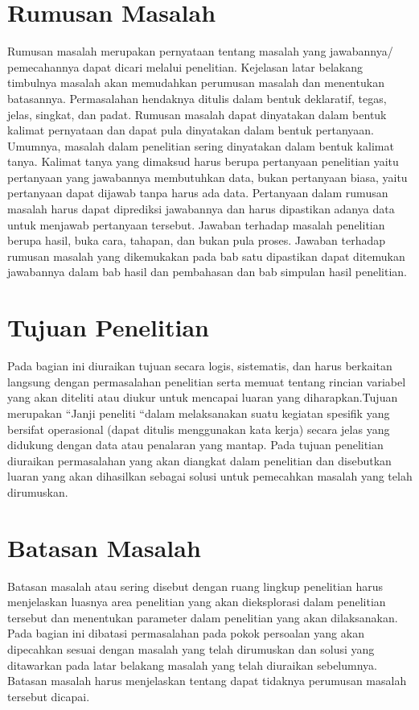 \section{Rumusan Masalah}
Rumusan masalah merupakan pernyataan tentang masalah yang jawabannya/ pemecahannya dapat dicari melalui penelitian. Kejelasan latar belakang timbulnya masalah akan memudahkan perumusan masalah dan menentukan batasannya. Permasalahan hendaknya  ditulis  dalam  bentuk  deklaratif,  tegas, jelas, singkat, dan padat. Rumusan masalah dapat dinyatakan dalam bentuk kalimat pernyataan  dan dapat pula dinyatakan dalam bentuk pertanyaan. Umumnya, masalah dalam penelitian sering dinyatakan dalam bentuk kalimat tanya. Kalimat tanya yang dimaksud harus berupa pertanyaan penelitian yaitu pertanyaan yang jawabannya membutuhkan data, bukan pertanyaan biasa,  yaitu pertanyaan  dapat dijawab tanpa harus ada data.  
Pertanyaan dalam rumusan masalah harus dapat diprediksi jawabannya dan harus dipastikan adanya data untuk menjawab pertanyaan tersebut. Jawaban terhadap masalah penelitian berupa hasil, buka cara, tahapan, dan bukan pula proses. Jawaban terhadap rumusan masalah yang dikemukakan pada bab satu  dipastikan  dapat ditemukan  jawabannya  dalam bab hasil dan pembahasan dan bab simpulan hasil penelitian. 

\section{Tujuan Penelitian}
Pada bagian ini diuraikan   tujuan   secara   logis, sistematis, dan   harus   berkaitan   langsung   dengan permasalahan penelitian serta memuat tentang rincian variabel yang akan diteliti atau diukur untuk mencapai luaran yang diharapkan.Tujuan merupakan “Janji peneliti “dalam melaksanakan suatu kegiatan spesifik yang bersifat operasional (dapat ditulis menggunakan kata kerja) secara jelas yang  didukung dengan data atau penalaran yang mantap. Pada tujuan penelitian  diuraikan permasalahan  yang akan diangkat dalam penelitian dan   disebutkan   luaran   yang   akan   dihasilkan   sebagai   solusi   untuk   pemecahkan masalah yang telah dirumuskan.

\section{Batasan Masalah}
Batasan masalah atau sering disebut dengan ruang  lingkup penelitian      harus  menjelaskan luasnya area penelitian yang akan dieksplorasi dalam penelitian tersebut dan menentukan parameter dalam penelitian yang akan dilaksanakan. Pada bagian ini   dibatasi  permasalahan pada pokok persoalan  yang akan dipecahkan  sesuai dengan masalah yang telah dirumuskan dan  solusi yang ditawarkan pada latar belakang masalah yang telah diuraikan sebelumnya. Batasan  masalah  harus  menjelaskan  tentang  dapat  tidaknya  perumusan masalah tersebut dicapai.

